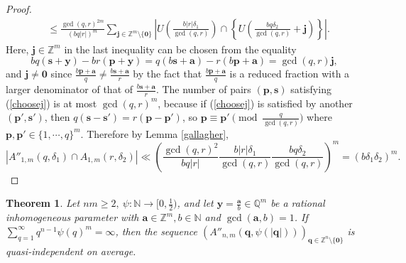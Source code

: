 \documentclass[reqno]{amsart}
\newtheorem{theorem}{Theorem}
\theoremstyle{definition}
\theoremstyle{remark}
\begin{document}
\begin{proof}
\begin{align*}
        &\leq \frac{\gcd(q,r)^{2m}}{(bq|r|)^m} \sum_{\mathbf{j} \in \mathbb{Z}^m\setminus \{\mathbf{0}\}} \left|U\left(\frac{b|r|\delta_1}{\gcd(q,r)}\right) \cap \left\{U\left(\frac{bq\delta_2}{\gcd(q,r)} + \mathbf{j} \right)\right\}\right|.
    \end{align*}
    Here, $\mathbf{j} \in \mathbb{Z}^m$ in the last inequality can be chosen from the equality
    \begin{equation}\label{choosej}
        bq(\mathbf{s} + \mathbf{y}) - br(\mathbf{p} + \mathbf{y}) = q(b\mathbf{s} + \mathbf{a}) - r(b\mathbf{p} + \mathbf{a}) =\gcd(q,r) \mathbf{j},
    \end{equation}
    and $\mathbf{j} \neq \mathbf{0}$ since $\frac{b\mathbf{p} + \mathbf{a}}{q} \neq \frac{b\mathbf{s} + \mathbf{a}}{r}$ by the fact that $\frac{b\mathbf{p} + \mathbf{a}}{q}$ is a reduced fraction with a larger denominator of that of $\frac{b\mathbf{s} + \mathbf{a}}{r}$. The number of pairs $(\mathbf{p}, \mathbf{s})$ satisfying (\ref{choosej}) is at most $\gcd(q,r)^m$, because if (\ref{choosej}) is satisfied by another $(\mathbf{p}',\mathbf{s}')$, then $q(\mathbf{s} - \mathbf{s}') = r(\mathbf{p} - \mathbf{p}')$, so $\mathbf{p} \equiv \mathbf{p}' \pmod{\frac{q}{\gcd(q,r)}}$ where $\mathbf{p}, \mathbf{p}' \in \{1, \cdots, q\}^m$. Therefore by Lemma \ref{gallagher},
    $$|A''_{1,m}(q,\delta_1) \cap A_{1,m}(r,\delta_2)| \ll \left(\frac{\gcd(q,r)^2}{bq|r|} \frac{b|r|\delta_1}{\gcd(q,r)} \frac{bq\delta_2}{\gcd(q,r)}\right)^m = (b\delta_1\delta_2)^m.$$
\end{proof}
\begin{theorem}\label{thm5}
    Let $nm \geq 2,\ \psi: \mathbb{N} \to [0,\frac{1}{2})$, and let $\mathbf{y} = \frac{\mathbf{a}}{b} \in \mathbb{Q}^m$ be a rational inhomogeneous parameter with $\mathbf{a} \in \mathbb{Z}^m, b \in \mathbb{N}$ and $\gcd(\mathbf{a},b)=1$. If $\sum_{q=1}^\infty q^{n-1}\psi(q)^m = \infty$, then the sequence $(A''_{n,m}(\mathbf{q}, \psi(|\mathbf{q}|)))_{\mathbf{q}\in\mathbb{Z}^n \setminus \{\mathbf{0}\}}$ is quasi-independent on average.
\end{theorem}
\end{document}
